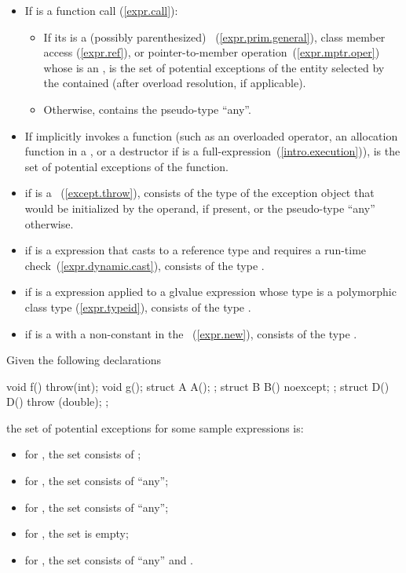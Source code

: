\begin{itemize}
\item
If  is a function call (\ref{expr.call}):
\begin{itemize}
\item
If its  is a (possibly parenthesized)
~(\ref{expr.prim.general}), class member access
(\ref{expr.ref}), or pointer-to-member operation~(\ref{expr.mptr.oper})
whose  is an ,
 is the set of potential exceptions of the entity selected by the
contained  (after overload resolution, if applicable).
\item
Otherwise,  contains the pseudo-type “any”.
\end{itemize}

\item
If  implicitly invokes a function (such as an overloaded operator,
an allocation function in a , or a destructor
if  is a full-expression~(\ref{intro.execution})),
 is the set of potential exceptions of the function.
\item
if  is a ~(\ref{except.throw}),
 consists of the type of the exception object that would be
initialized by the operand, if present, or the pseudo-type “any” otherwise.
\item
if  is a  expression that casts to a reference type and
requires a run-time check~(\ref{expr.dynamic.cast}),
 consists of the type .
\item
if  is a  expression applied to a glvalue expression whose
type is a polymorphic class type (\ref{expr.typeid}),
 consists of the type .
\item
if  is a  with a non-constant
 in the ~(\ref{expr.new}),
 consists of the type .
\end{itemize}

\enterexample
Given the following declarations
\begin{codeblock}
  void f() throw(int); 
  void g();  
  struct A { A(); };
  struct B { B() noexcept; };
  struct D() { D() throw (double); };
\end{codeblock}
the set of potential exceptions for some sample expressions is:
\begin{itemize}
\item
for , the set consists of ;
\item
for , the set consists of “any”;
\item
for , the set consists of “any”;
\item
for , the set is empty;
\item
for , the set consists of “any” and .
\end{itemize}
\exitexample

